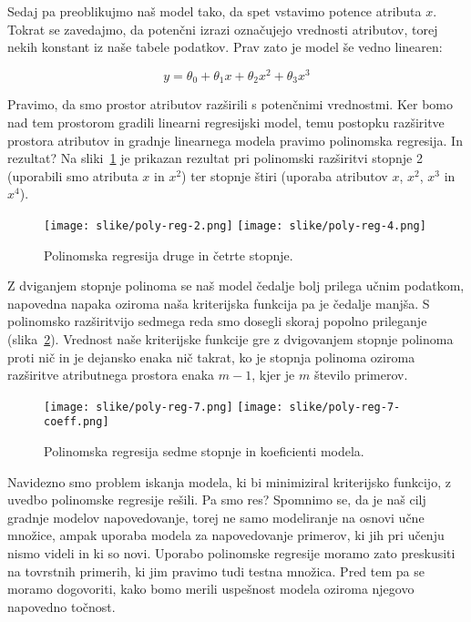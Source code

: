 Sedaj pa preoblikujmo naš model tako, da spet vstavimo potence atributa $x$. Tokrat se zavedajmo, da potenčni izrazi označujejo vrednosti atributov, torej nekih konstant iz naše tabele podatkov. Prav zato je model še vedno linearen:

$$ y=\theta_0 + \theta_1 x + \theta_2 x^2 + \theta_3 x^3 $$

Pravimo, da smo prostor atributov razširili s potenčnimi vrednostmi. Ker bomo nad tem prostorom gradili linearni regresijski model, temu postopku razširitve prostora atributov in gradnje linearnega modela pravimo polinomska regresija. In rezultat? Na sliki~\ref{fig:poly-linear-fit} je prikazan rezultat pri polinomski razširitvi stopnje 2 (uporabili smo atributa $x$ in $x^2$) ter stopnje štiri (uporaba atributov $x$, $x^2$, $x^3$ in $x^4$).

\begin{figure}[htbp]
\begin{center}
  \texttt{[image: slike/poly-reg-2.png]}\hfill
  \texttt{[image: slike/poly-reg-4.png]}
\caption{Polinomska regresija druge in četrte stopnje.}
\label{fig:poly-linear-fit}
\end{center}
\end{figure}

Z dviganjem stopnje polinoma se naš model čedalje bolj prilega učnim podatkom, napovedna napaka oziroma naša kriterijska funkcija pa je čedalje manjša. S polinomsko razširitvijo sedmega reda smo dosegli skoraj popolno prileganje (slika~\ref{fig:poly-linear-fit7}). Vrednost naše kriterijske funkcije gre z dvigovanjem stopnje polinoma proti nič in je dejansko enaka nič takrat, ko je stopnja polinoma oziroma razširitve atributnega prostora enaka $m-1$, kjer je $m$ število primerov.

\begin{figure}[htbp]
\begin{center}
  \texttt{[image: slike/poly-reg-7.png]}
  \hfill
  \texttt{[image: slike/poly-reg-7-coeff.png]}
\caption{Polinomska regresija sedme stopnje in koeficienti modela.}
\label{fig:poly-linear-fit7}
\end{center}
\end{figure}

Navidezno smo problem iskanja modela, ki bi minimiziral kriterijsko funkcijo, z uvedbo polinomske regresije rešili. Pa smo res? Spomnimo se, da je naš cilj gradnje modelov napovedovanje, torej ne samo modeliranje na osnovi učne množice, ampak uporaba modela za napovedovanje primerov, ki jih pri učenju nismo videli in ki so novi. Uporabo polinomske regresije moramo zato preskusiti na tovrstnih primerih, ki jim pravimo tudi testna množica. Pred tem pa se moramo dogovoriti, kako bomo merili uspešnost modela oziroma njegovo napovedno točnost.


